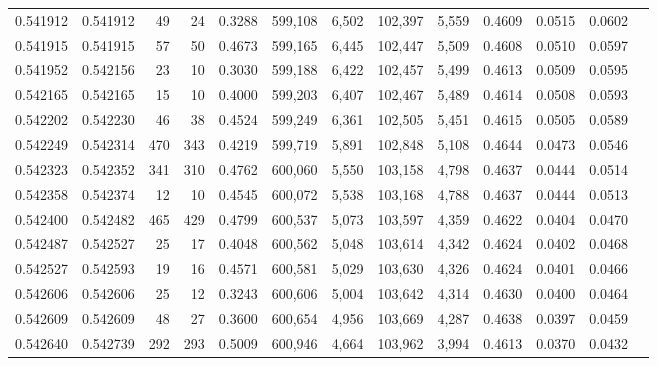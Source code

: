\begin{tabular}{rrrrrrrrrrrrr}
0.541912 & 0.541912 &    49 &    24 &                                     0.3288 & 599,108 &   6,502 & 102,397 &   5,559 & 0.4609 & 0.0515 & 0.0602 \\
0.541915 & 0.541915 &    57 &    50 &                                     0.4673 & 599,165 &   6,445 & 102,447 &   5,509 & 0.4608 & 0.0510 & 0.0597 \\
0.541952 & 0.542156 &    23 &    10 &                                     0.3030 & 599,188 &   6,422 & 102,457 &   5,499 & 0.4613 & 0.0509 & 0.0595 \\
0.542165 & 0.542165 &    15 &    10 &                                     0.4000 & 599,203 &   6,407 & 102,467 &   5,489 & 0.4614 & 0.0508 & 0.0593 \\
0.542202 & 0.542230 &    46 &    38 &                                     0.4524 & 599,249 &   6,361 & 102,505 &   5,451 & 0.4615 & 0.0505 & 0.0589 \\
0.542249 & 0.542314 &   470 &   343 &                                     0.4219 & 599,719 &   5,891 & 102,848 &   5,108 & 0.4644 & 0.0473 & 0.0546 \\
0.542323 & 0.542352 &   341 &   310 &                                     0.4762 & 600,060 &   5,550 & 103,158 &   4,798 & 0.4637 & 0.0444 & 0.0514 \\
0.542358 & 0.542374 &    12 &    10 &                                     0.4545 & 600,072 &   5,538 & 103,168 &   4,788 & 0.4637 & 0.0444 & 0.0513 \\
0.542400 & 0.542482 &   465 &   429 &                                     0.4799 & 600,537 &   5,073 & 103,597 &   4,359 & 0.4622 & 0.0404 & 0.0470 \\
0.542487 & 0.542527 &    25 &    17 &                                     0.4048 & 600,562 &   5,048 & 103,614 &   4,342 & 0.4624 & 0.0402 & 0.0468 \\
0.542527 & 0.542593 &    19 &    16 &                                     0.4571 & 600,581 &   5,029 & 103,630 &   4,326 & 0.4624 & 0.0401 & 0.0466 \\
0.542606 & 0.542606 &    25 &    12 &                                     0.3243 & 600,606 &   5,004 & 103,642 &   4,314 & 0.4630 & 0.0400 & 0.0464 \\
0.542609 & 0.542609 &    48 &    27 &                                     0.3600 & 600,654 &   4,956 & 103,669 &   4,287 & 0.4638 & 0.0397 & 0.0459 \\
0.542640 & 0.542739 &   292 &   293 &                                     0.5009 & 600,946 &   4,664 & 103,962 &   3,994 & 0.4613 & 0.0370 & 0.0432 \\

\end{tabular}
